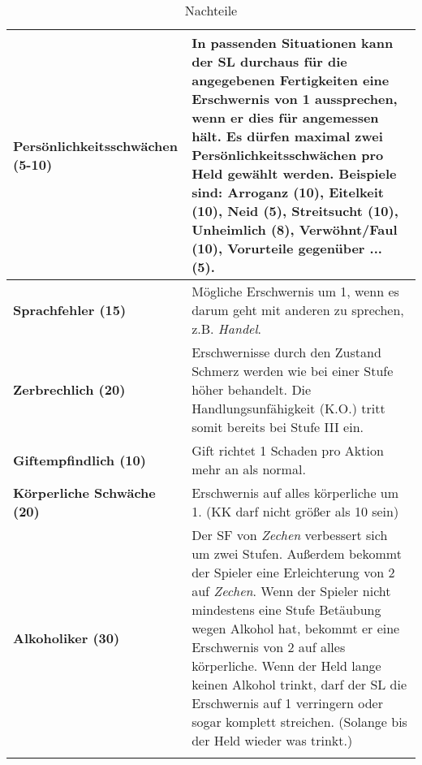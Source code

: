 \begin{longtable}{|p{5cm}|p{11cm}|}
\textbf{Persönlichkeitsschwächen (5-10)} & In passenden Situationen kann der SL durchaus für die angegebenen Fertigkeiten eine Erschwernis von 1 aussprechen, wenn er dies für angemessen hält. Es dürfen maximal zwei Persönlichkeitsschwächen pro Held gewählt werden. Beispiele sind: \textbf{Arroganz (10)}, \textbf{Eitelkeit (10)}, \textbf{Neid (5)}, \textbf{Streitsucht (10)}, \textbf{Unheimlich (8)}, \textbf{Verwöhnt/Faul (10)}, \textbf{Vorurteile gegenüber ... (5)}. \\ \hline
\textbf{Sprachfehler (15)} & Mögliche Erschwernis um 1, wenn es darum geht mit anderen zu sprechen, z.B. \textit{Handel}. \\ \hline

\textbf{Zerbrechlich (20)} & Erschwernisse durch den Zustand Schmerz werden wie bei einer Stufe höher behandelt. Die Handlungsunfähigkeit (K.O.) tritt somit bereits bei Stufe III ein. \\ \hline

\textbf{Giftempfindlich (10)} & Gift richtet 1 Schaden pro Aktion mehr an als normal. \\ \hline

\textbf{Körperliche Schwäche (20)} & Erschwernis auf alles körperliche um 1. (KK darf nicht größer als 10 sein) \\ \hline

\textbf{Alkoholiker (30)} & Der SF von \textit{Zechen} verbessert sich um zwei Stufen. Außerdem bekommt der Spieler eine Erleichterung von 2 auf \textit{Zechen}. Wenn der Spieler nicht mindestens eine Stufe Betäubung wegen Alkohol hat, bekommt er eine Erschwernis von 2 auf alles körperliche. Wenn der Held lange keinen Alkohol trinkt, darf der SL die Erschwernis auf 1 verringern oder sogar komplett streichen. (Solange bis der Held wieder was trinkt.) \\ \hline

\caption{Nachteile}
\label{tab:Nachteile}
\end{longtable}